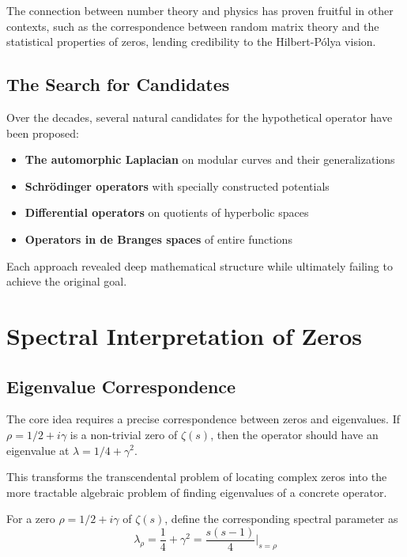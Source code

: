 \begin{remark}
The connection between number theory and physics has proven fruitful in other contexts, such as the correspondence between random matrix theory and the statistical properties of zeros, lending credibility to the Hilbert-Pólya vision.
\end{remark}

\subsection{The Search for Candidates}

Over the decades, several natural candidates for the hypothetical operator have been proposed:

\begin{itemize}
\item \textbf{The automorphic Laplacian} on modular curves and their generalizations
\item \textbf{Schrödinger operators} with specially constructed potentials
\item \textbf{Differential operators} on quotients of hyperbolic spaces
\item \textbf{Operators in de Branges spaces} of entire functions
\end{itemize}

Each approach revealed deep mathematical structure while ultimately failing to achieve the original goal.

\section{Spectral Interpretation of Zeros}
\label{sec:spectral_interpretation}

\subsection{Eigenvalue Correspondence}

The core idea requires a precise correspondence between zeros and eigenvalues. If $\rho = 1/2 + i\gamma$ is a non-trivial zero of $\zeta(s)$, then the operator should have an eigenvalue at $\lambda = 1/4 + \gamma^2$.

This transforms the transcendental problem of locating complex zeros into the more tractable algebraic problem of finding eigenvalues of a concrete operator.

\begin{definition}
For a zero $\rho = 1/2 + i\gamma$ of $\zeta(s)$, define the corresponding spectral parameter as
$$\lambda_\rho = \frac{1}{4} + \gamma^2 = \frac{s(s-1)}{4}\bigg|_{s=\rho}$$
\end{definition}

